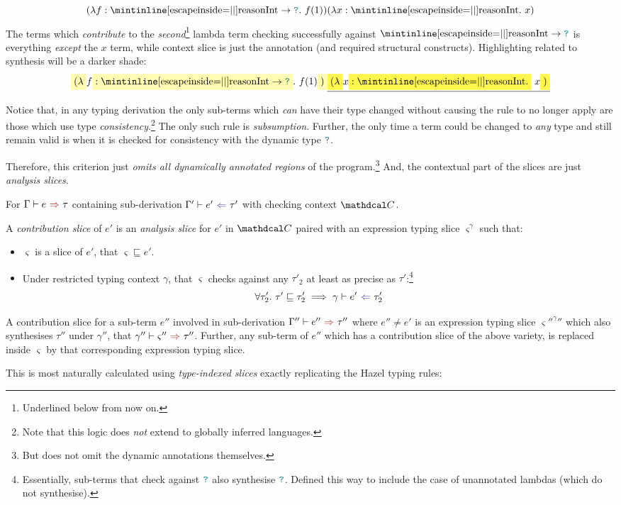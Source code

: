 \[(\lambda f: \code{Int} \to \dyn.\ f(1))(\lambda x : \code{Int}.\ x)\]
The terms which \textit{contribute} to the \textit{second}\footnote{Underlined below from now on.} lambda term checking successfully against $\code{Int} \to \dyn$ is everything \textit{except} the $x$ term, while context slice is just the annotation (and required structural constructs). Highlighting related to synthesis will be a darker shade:
\[\hlcmaths[yellow!30]{(\lambda} f\hlcmaths[yellow!30]{: \code{Int} \to \dyn}.\ f(1)\hlcmaths[yellow!30]{)}\underline{\hlcmaths[yellow!70]{(\lambda} x \hlcmaths[yellow!70]{: \code{Int}.}\ x\hlcmaths[yellow!70]{)}}\]

Notice that, in any typing derivation the only sub-terms which \textit{can} have their type changed without causing the rule to no longer apply are those which use type \textit{consistency}.\footnote{Note that this logic does \textit{not} extend to globally inferred languages.} The only such rule is \textit{subsumption}. Further, the only time a term could be changed to \textit{any} type and still remain valid is when it is checked for consistency with the dynamic type ${\color{teal}\texttt{?}}$.

Therefore, this criterion just \textit{omits all dynamically annotated regions} of the program.\footnote{But does not omit the dynamic annotations themselves.} And, the contextual part of the slices are just \textit{analysis slices}.

\begin{definition}\label{def:ContributionSlice}
For $\synthesis{e}{\tau}$ containing sub-derivation $\analysis[\Gamma']{e'}{\tau'}$ with checking context $\C$.

A \textit{contribution slice} of $e'$ is an \textit{analysis slice} for $e'$ in $\C$ paired with an expression typing slice $\varsigma^\gamma$ such that:
\begin{itemize}
\item $\varsigma$ is a slice of $e'$, that $\varsigma \sqsubseteq e'$.
\item Under restricted typing context $\gamma$, that $\varsigma$ checks against any $\tau'_2$ at least as precise as $\tau'$:\footnote{Essentially, sub-terms that check against ${\color{teal}\texttt{?}}$ also synthesise ${\color{teal}\texttt{?}}$. Defined this way to include the case of unannotated lambdas (which do not synthesise).}
\[\forall \tau'_2.\ \tau' \sqsubseteq \tau'_2 \implies \analysis[\gamma]{e'}{\tau'_2}\]
\end{itemize}
A contribution slice for a sub-term $e''$ involved in sub-derivation $\synthesis[\Gamma'']{e''}{\tau''}$ where $e'' \neq e'$ is an expression typing slice $\varsigma''^\gamma''$ which also synthesises $\tau''$ under $\gamma''$, that $\synthesis[\gamma'']{\varsigma''}{\tau''}$. Further, any sub-term of $e''$ which has a contribution slice of the above variety, is replaced inside $\varsigma$ by that corresponding expression typing slice.
\end{definition} 
This is most naturally calculated using \textit{type-indexed slices} exactly replicating the Hazel typing rules:

